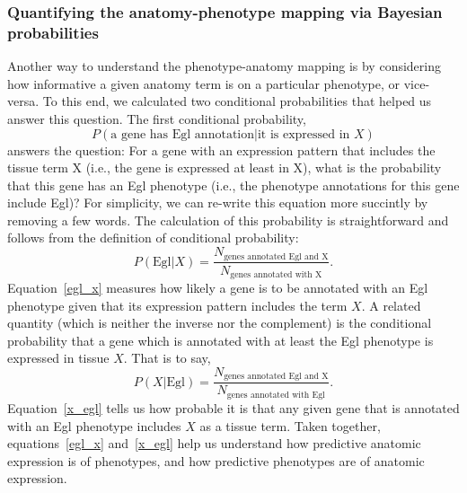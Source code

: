 \documentclass[10pt, onecolumn]{article}
\begin{document}
\subsubsection*{Quantifying the anatomy-phenotype
                mapping via Bayesian probabilities}
Another way to understand the phenotype-anatomy mapping is by considering how
informative a given anatomy term is on a particular phenotype, or vice-versa. To
this end, we calculated two conditional probabilities that helped us answer this
question. The first conditional probability,
\begin{equation}
  P( \text{a gene has Egl annotation} | \text{it is expressed in } X)
\end{equation}
answers the question: For a gene with an expression pattern that includes the
tissue term X (i.e., the gene is expressed at least in X), what is the
probability that this gene has an Egl phenotype (i.e., the phenotype annotations
for this gene include Egl)? For simplicity, we can re-write this equation more
succintly by removing a few words. The calculation of this probability is
straightforward and follows from the definition of conditional probability:
\begin{equation}
  P(\text{Egl}|X) = \frac{N_\text{genes annotated Egl and X}}
                         {N_\text{genes annotated with X}}.
\label{egl_x}
\end{equation}
Equation~\ref{egl_x} measures how likely a gene is to be annotated with an Egl
phenotype given that its expression pattern includes the term $X$. A related
quantity (which is neither the inverse nor the complement) is the conditional
probability that a gene which is annotated with at least the Egl phenotype is
expressed in tissue $X$. That is to say,
\begin{equation}
  P(X|\text{Egl}) = \frac{N_\text{genes annotated Egl and X}}
                         {N_\text{genes annotated with Egl}}.
  \label{x_egl}
\end{equation}
Equation~\ref{x_egl} tells us how probable it is that any given gene that is
annotated with an Egl phenotype includes $X$ as a tissue term. Taken together,
equations~\ref{egl_x} and~\ref{x_egl} help us understand how predictive anatomic
expression is of phenotypes, and how predictive phenotypes are of anatomic
expression.
\end{document}
